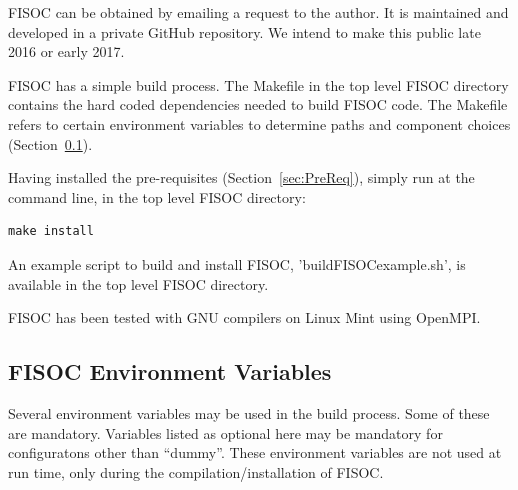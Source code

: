 \documentclass[12pt]{article}
\begin{document}
FISOC can be obtained by emailing a request to the author.  It is maintained and developed in a 
private GitHub repository.  We intend to make this public late 2016 or early 2017.

FISOC has a simple build process.  The Makefile in the top level FISOC directory contains the 
hard coded dependencies needed to build FISOC code.  The Makefile refers to certain 
environment variables to determine paths and component choices (Section~\ref{sec:EnvVars}). 

Having installed the pre-requisites (Section~\ref{sec:PreReq}), simply run at the command line, 
in the top level FISOC directory:
\begin{lstlisting}
make install
\end{lstlisting}

An example script to build and install FISOC, 'buildFISOCexample.sh', is available in the top 
level FISOC directory.

FISOC has been tested with GNU compilers on Linux Mint using OpenMPI. 



\subsection{FISOC Environment Variables}
\label{sec:EnvVars}

Several environment variables may be used in the build process. 
Some of these are mandatory. 
Variables listed as optional here may be mandatory for configuratons other than 
``dummy''.
These environment variables are not used at run time, only during 
the compilation/installation of FISOC.
\end{document}

